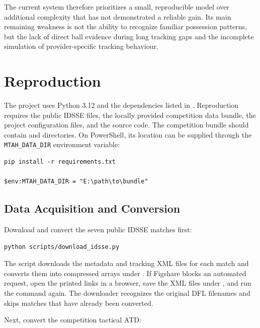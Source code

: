 \documentclass[11pt,a4paper]{article}
\begin{document}
The current system therefore prioritizes a small, reproducible model over additional complexity that has not demonstrated a reliable gain. Its main remaining weakness is not the ability to recognize familiar possession patterns, but the lack of direct ball evidence during long tracking gaps and the incomplete simulation of provider-specific tracking behaviour.


\section{Reproduction}

The project uses Python 3.12 and the dependencies listed in . Reproduction requires the public IDSSE files, the locally provided competition data bundle, the project configuration files, and the source code. The competition bundle should contain  and  directories. On PowerShell, its location can be supplied through the \texttt{MTAH\_DATA\_DIR} environment variable:

\begin{lstlisting}[style=terminal]
pip install -r requirements.txt

$env:MTAH_DATA_DIR = "E:\path\to\bundle"
\end{lstlisting}

\subsection{Data Acquisition and Conversion}

Download and convert the seven public IDSSE matches first:

\begin{lstlisting}[style=terminal]
python scripts/download_idsse.py
\end{lstlisting}

The script downloads the metadata and tracking XML files for each match and converts them into compressed arrays under . If Figshare blocks an automated request, open the printed links in a browser, save the XML files under , and run the command again. The downloader recognizes the original DFL filenames and skips matches that have already been converted.

Next, convert the competition tactical ATD:
\end{document}
